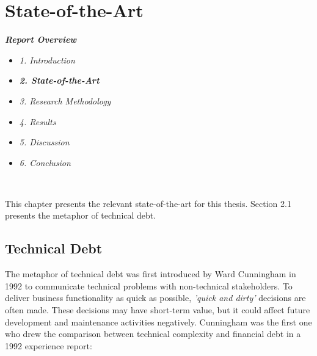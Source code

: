 






\chapter{State-of-the-Art}
\label{chap:sota}

\textit{\textbf{Report Overview}}
\begin{itemize}
	\item \textit{1. Introduction}
	\item \textit{\textbf{2. State-of-the-Art}}
	\item \textit{3. Research Methodology}
	\item \textit{4. Results}
	\item \textit{5. Discussion}
	\item \textit{6. Conclusion}
\end{itemize} \


This chapter presents the relevant state-of-the-art for this thesis. Section 2.1 presents the metaphor of technical debt. 







\section{Technical Debt}
\label{sec:techdebt}
The metaphor of technical debt was first introduced by Ward Cunningham in 1992 to communicate technical problems with non-technical stakeholders\cite{p29-cunningham}. To deliver business functionality as quick as possible, \textit{'quick and dirty'} decisions are often made. These decisions may have short-term value, but it could affect future development and maintenance activities negatively. Cunningham was the first one who drew the comparison between technical complexity and financial debt in a 1992 experience report\cite{p29-cunningham}: 

